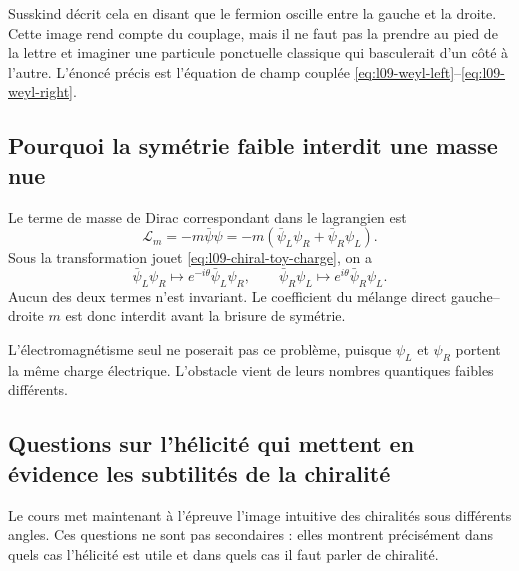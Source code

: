 Susskind décrit cela en disant que le fermion oscille entre la gauche et la droite. Cette image rend compte du couplage, mais il ne faut pas la prendre au pied de la lettre et imaginer une particule ponctuelle classique qui basculerait d’un côté à l’autre. L’énoncé précis est l’équation de champ couplée \eqref{eq:l09-weyl-left}--\eqref{eq:l09-weyl-right}.

\begin{classroomqa}\end{classroomqa}

\subsection{Pourquoi la symétrie faible interdit une masse nue}

Le terme de masse de Dirac correspondant dans le lagrangien est \begin{equation}
  \mathcal L_m
  =-m\bar\psi\psi
  =-m\left(\bar\psi_L\psi_R+\bar\psi_R\psi_L\right).
  \label{eq:l09-bare-dirac-mass}
\end{equation}Sous la transformation jouet \eqref{eq:l09-chiral-toy-charge}, on a \begin{equation}
  \bar\psi_L\psi_R\longmapsto
  e^{-i\theta}\bar\psi_L\psi_R,
  \qquad
  \bar\psi_R\psi_L\longmapsto
  e^{i\theta}\bar\psi_R\psi_L.
\end{equation}Aucun des deux termes n’est invariant. Le coefficient du mélange direct gauche--droite \(m\) est donc interdit avant la brisure de symétrie.

L’électromagnétisme seul ne poserait pas ce problème, puisque \(\psi_L\) et \(\psi_R\) portent la même charge électrique. L’obstacle vient de leurs nombres quantiques faibles différents.

\subsection{Questions sur l’hélicité qui mettent en évidence les subtilités de la chiralité}

Le cours met maintenant à l’épreuve l’image intuitive des chiralités sous différents angles. Ces questions ne sont pas secondaires : elles montrent précisément dans quels cas l’hélicité est utile et dans quels cas il faut parler de chiralité.

